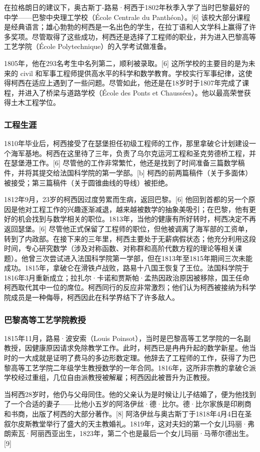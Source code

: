 在拉格朗日的建议下，奥古斯丁-路易·柯西于1802年秋季入学了当时巴黎最好的中学——巴黎中央理工学校（École Centrale du Panthéon）。[6] 该校大部分课程是经典语言；雄心勃勃的柯西是一名出色的学生，在拉丁语和人文学科上赢得了许多奖项。尽管取得了这些成功，柯西还是选择了工程师的职业，并为进入巴黎高等工艺学院（École Polytechnique）的入学考试做准备。

1805年，他在293名考生中名列第二，顺利被录取。[6] 这所学校的主要目的是为未来的 civil 和军事工程师提供高水平的科学和数学教育。学校实行军事纪律，这使得柯西在适应上遇到了一些问题。尽管如此，他还是在18岁时于1807年完成了课程，并进入了桥梁与道路学校（École des Ponts et Chaussées）。他以最高荣誉获得土木工程学位。
\subsubsection{工程生涯}  
1810年毕业后，柯西接受了在瑟堡担任初级工程师的工作，那里拿破仑计划建设一个海军基地。柯西在这里待了三年，负责了乌尔克运河工程和圣克劳德桥工程，并在瑟堡港工作。[6] 尽管他的工作非常繁忙，他还是找到了时间准备三篇数学稿件，并将其提交给法国科学院的第一学部。[b] 柯西的前两篇稿件（关于多面体）被接受；第三篇稿件（关于圆锥曲线的导线）被拒绝。

1812年9月，23岁的柯西因过度劳累而生病，返回巴黎。[6] 他回到首都的另一个原因是他对工程工作的兴趣逐渐减退，越来越被数学的抽象美吸引；在巴黎，他有更好的机会找到与数学相关的职位。1813年，当他的健康有所好转时，柯西决定不再返回瑟堡。[6] 尽管他正式保留了工程师的职位，但他被调离了海军部的工资单，转到了内政部。在接下来的三年里，柯西主要处于无薪病假状态；他充分利用这段时间，专心研究数学（涉及对称函数、对称群和高阶代数方程的理论等相关课题）。他曾三次尝试进入法国科学院第一学部，但在1813年至1815年期间三次未能成功。1815年，拿破仑在滑铁卢战败，路易十八国王恢复了王位。法国科学院于1816年3月重新成立；拉扎尔·卡诺和贾斯帕·孟热因政治原因被移除，国王任命柯西取代其中一位的席位。柯西同行的反应非常激烈；他们认为柯西被接纳为科学院成员是一种侮辱，柯西因此在科学界结下了许多敌人。
\subsubsection{巴黎高等工艺学院教授}  
1815年11月，路易·波安索（Louis Poinsot），当时是巴黎高等工艺学院的一名副教授，因健康原因请求免除教学工作。此时，柯西已是冉冉升起的数学新星。他当时的一大成就是证明了费马的多边形数定理。他辞去了工程师的工作，获得了为巴黎高等工艺学院二年级学生教授数学的一年合同。1816年，这所非宗教的拿破仑派学校经过重组，几位自由派教授被解雇；柯西因此被晋升为正教授。

当柯西28岁时，他仍与父母同住。他的父亲认为是时候让儿子结婚了，便为他找到了一个合适的妻子——比他小五岁的阿洛伊丝·德·比尔。德·比尔家族是印刷商和书商，出版了柯西的大部分著作。[8] 阿洛伊丝与奥古斯丁于1818年4月4日在圣叙尔皮斯教堂举行了盛大的天主教婚礼。1819年，这对夫妇的第一个女儿玛丽·弗朗索瓦·阿丽西亚出生，1823年，第二个也是最后一个女儿玛丽·马蒂尔德出生。[9]

